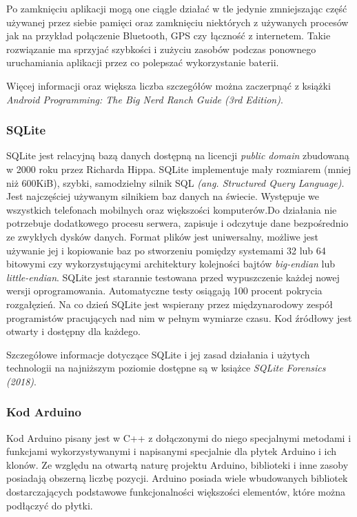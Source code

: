 \documentclass[a4paper,12pt, twoside]{article}
\begin{document}
	Po zamknięciu aplikacji mogą one ciągle działać w tle jedynie zmniejszając część używanej przez siebie pamięci oraz zamknięciu niektórych z używanych procesów jak na przykład połączenie Bluetooth, GPS czy łączność z internetem. Takie rozwiązanie ma sprzyjać szybkości i zużyciu zasobów podczas ponownego uruchamiania aplikacji przez co polepszać wykorzystanie baterii\cite{batterysave}.
	
	Więcej informacji oraz większa liczba szczegółów można zaczerpnąć z książki \textit{Android Programming: The Big Nerd Ranch Guide (3rd Edition)}\cite{androidprogramming}.
	
	\vspace{1cm}
	\subsubsection{SQLite}
	SQLite jest relacyjną bazą danych dostępną na licencji \textit{public domain}\cite{publicdomain} zbudowaną w 2000 roku przez Richarda Hippa. SQLite implementuje mały rozmiarem (mniej niż 600KiB), szybki, samodzielny  silnik SQL \textit{(ang. Structured Query Language)}. Jest najczęściej używanym silnikiem baz danych na świecie. Występuje we wszystkich telefonach mobilnych oraz większości komputerów.Do działania nie potrzebuje dodatkowego procesu serwera, zapisuje i odczytuje dane bezpośrednio ze zwykłych dysków danych. Format plików jest uniwersalny, możliwe jest używanie jej i kopiowanie baz po stworzeniu pomiędzy systemami 32 lub 64 bitowymi czy wykorzystującymi architektury kolejności bajtów \textit{big-endian} lub \textit{little-endian}\cite{endian}. SQLite jest starannie testowana przed wypuszczenie każdej nowej wersji oprogramowania. Automatyczne testy osiągają 100 procent pokrycia rozgałęzień\cite{branchcoverage}. Na co dzień SQLite jest wspierany przez międzynarodowy zespół programistów pracujących nad nim w pełnym wymiarze czasu. Kod źródłowy jest otwarty i dostępny dla każdego\cite{sqlite}.
	
	Szczegółowe informacje dotyczące SQLite i jej zasad działania i użytych technologii na najniższym poziomie dostępne są w książce \textit{SQLite Forensics (2018)}\cite{sqliteforensics}. 
	
	\vspace{1cm}
	\subsubsection{Kod Arduino}
	Kod Arduino pisany jest w C++ z dołączonymi do niego specjalnymi metodami i funkcjami wykorzystywanymi i napisanymi specjalnie dla płytek Arduino i ich klonów. Ze względu na otwartą naturę projektu Arduino, biblioteki i inne zasoby posiadają obszerną liczbę pozycji. Arduino posiada wiele wbudowanych bibliotek dostarczających podstawowe funkcjonalności większości elementów, które można podłączyć do płytki. 
	
\end{document}
